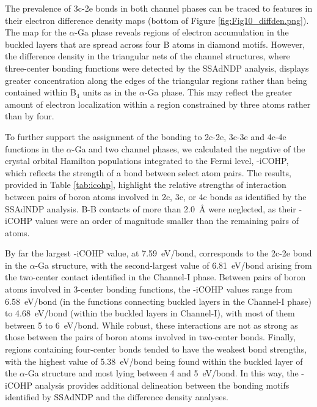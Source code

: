 \documentclass[reprint,aps,prl,twocolumn,letterpaper]{revtex4-2}
\begin{document}
The prevalence of 3c-2e bonds in both channel phases can be traced to features in their electron difference density maps (bottom of Figure \ref{fig:Fig10_diffden.png}). The map for the $\alpha$-Ga phase reveals regions of electron accumulation in the buckled layers that are spread across four B atoms in diamond motifs. However, the difference density in the triangular nets of the channel structures, where three-center bonding functions were detected by the SSAdNDP analysis, displays greater concentration along the edges of the triangular regions rather than being contained within B$_{4}$ units as in the $\alpha$-Ga phase. This may reflect the greater amount of electron localization within a region constrained by three atoms rather than by four. 

To further support the assignment of the bonding to 2c-2e, 3c-3e and 4c-4e functions in the $\alpha$-Ga and two channel phases, we calculated the negative of the crystal orbital Hamilton populations integrated to the Fermi level, -iCOHP, which reflects the strength of a bond between select atom pairs. The results, provided in Table \ref{tab:icohp}, highlight the relative strengths of interaction between pairs of boron atoms involved in 2c, 3c, or 4c bonds as identified by the SSAdNDP analysis. B-B contacts of more than 2.0~\AA{} were neglected, as their -iCOHP values were an order of magnitude smaller than the remaining pairs of atoms.


By far the largest -iCOHP value, at 7.59~eV/bond, corresponds to the 2c-2e bond in the $\alpha$-Ga structure, with the second-largest value of 6.81~eV/bond arising from the two-center contact identified in the Channel-I phase. Between pairs of boron atoms involved in 3-center bonding functions, the -iCOHP values range from 6.58~eV/bond (in the functions connecting buckled layers in the Channel-I phase) to 4.68~eV/bond (within the buckled layers in Channel-I), with most of them between 5 to 6~eV/bond. While robust, these interactions are not as strong as those between the pairs of boron atoms involved in two-center bonds. Finally, regions containing four-center bonds tended to have the weakest bond strengths, with the highest value of 5.38~eV/bond being found within the buckled layer of the $\alpha$-Ga structure and most lying between 4 and 5~eV/bond. In this way, the -iCOHP analysis provides additional delineation between the bonding motifs identified by SSAdNDP and the difference density analyses.
\end{document}
